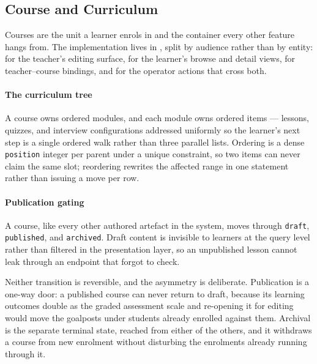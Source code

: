 \subsection{Course and Curriculum}
\label{sec:impl_course}

Courses are the unit a learner enrols in and the container every other feature hangs from. The implementation lives in , split by audience rather than by entity:  for the teacher's editing surface,  for the learner's browse and detail views,  for teacher--course bindings, and  for the operator actions that cross both.

\paragraph{The curriculum tree}
A course owns ordered modules, and each module owns ordered items --- lessons, quizzes, and interview configurations addressed uniformly so the learner's next step is a single ordered walk rather than three parallel lists. Ordering is a dense \texttt{position} integer per parent under a unique constraint, so two items can never claim the same slot; reordering rewrites the affected range in one statement rather than issuing a move per row.

\paragraph{Publication gating}
A course, like every other authored artefact in the system, moves through \texttt{draft}, \texttt{published}, and \texttt{archived}. Draft content is invisible to learners at the query level rather than filtered in the presentation layer, so an unpublished lesson cannot leak through an endpoint that forgot to check.

Neither transition is reversible, and the asymmetry is deliberate. Publication is a one-way door: a published course can never return to draft, because its learning outcomes double as the graded assessment scale and re-opening it for editing would move the goalposts under students already enrolled against them. Archival is the separate terminal state, reached from either of the others, and it withdraws a course from new enrolment without disturbing the enrolments already running through it.

